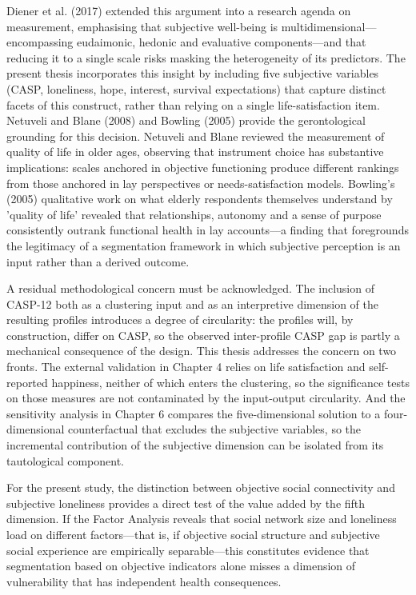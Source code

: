 Diener et al. (2017) extended this argument into a research agenda on measurement, emphasising that subjective well-being is multidimensional---encompassing eudaimonic, hedonic and evaluative components---and that reducing it to a single scale risks masking the heterogeneity of its predictors. The present thesis incorporates this insight by including five subjective variables (CASP, loneliness, hope, interest, survival expectations) that capture distinct facets of this construct, rather than relying on a single life-satisfaction item. Netuveli and Blane (2008) and Bowling (2005) provide the gerontological grounding for this decision. Netuveli and Blane reviewed the measurement of quality of life in older ages, observing that instrument choice has substantive implications: scales anchored in objective functioning produce different rankings from those anchored in lay perspectives or needs-satisfaction models. Bowling's (2005) qualitative work on what elderly respondents themselves understand by 'quality of life' revealed that relationships, autonomy and a sense of purpose consistently outrank functional health in lay accounts---a finding that foregrounds the legitimacy of a segmentation framework in which subjective perception is an input rather than a derived outcome.

A residual methodological concern must be acknowledged. The inclusion of CASP-12 both as a clustering input and as an interpretive dimension of the resulting profiles introduces a degree of circularity: the profiles will, by construction, differ on CASP, so the observed inter-profile CASP gap is partly a mechanical consequence of the design. This thesis addresses the concern on two fronts. The external validation in Chapter 4 relies on life satisfaction and self-reported happiness, neither of which enters the clustering, so the significance tests on those measures are not contaminated by the input-output circularity. And the sensitivity analysis in Chapter 6 compares the five-dimensional solution to a four-dimensional counterfactual that excludes the subjective variables, so the incremental contribution of the subjective dimension can be isolated from its tautological component.

For the present study, the distinction between objective social connectivity and subjective loneliness provides a direct test of the value added by the fifth dimension. If the Factor Analysis reveals that social network size and loneliness load on different factors---that is, if objective social structure and subjective social experience are empirically separable---this constitutes evidence that segmentation based on objective indicators alone misses a dimension of vulnerability that has independent health consequences.

